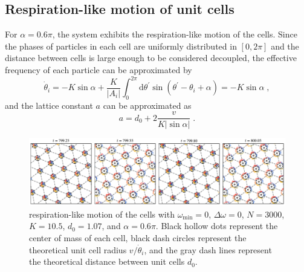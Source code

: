 \documentclass{article}
\begin{document}

\newpage
\subsection{Respiration-like motion of unit cells}

For $\alpha=0.6\pi$, the system exhibits the respiration-like motion of the cells. Since the phases of particles in each cell are uniformly distributed in $[0, 2\pi]$ and the distance between cells is large enough to be considered decoupled, the effective frequency of each particle can be approximated by
\begin{equation}
    \dot{\theta}_i=-K\sin \alpha +\frac{K}{\left| A_i \right|}\int_0^{2\pi}{\mathrm{d}\theta ^{\prime}\sin \left( \theta ^{\prime}-\theta _i+\alpha \right)}=-K\sin \alpha\;,
\end{equation}
and the lattice constant $a$ can be approximated as 
\begin{equation}
    a=d_0+2\frac{v}{K\left| \sin \alpha \right|}\;.
    \label{eq:latticeConstant}
\end{equation}
\begin{figure}[H]
    \centering
    \includegraphics[width=\textwidth]{./figs/respiration_snapshot.pdf}
    \caption{
        \label{fig:respiration_snapshot}
        respiration-like motion of the cells with $\omega _{\min}=0$, $\Delta \omega=0$, $N=3000$, $K=10.5$, $d_0=1.07$, and $\alpha=0.6\pi$. Black hollow dots represent the center of mass of each cell, black dash circles represent the theoretical unit cell radius $v/\dot{\theta}_i$, and the gray dash lines represent the theoretical distance between unit cells $d_0$.
    }
\end{figure}
\end{document}
